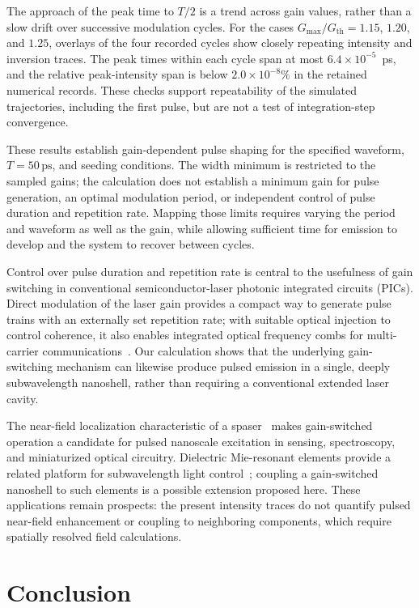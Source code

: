 \documentclass{optica-article}
\begin{document}
The approach of the peak time to $T/2$ is a trend across gain values, rather than a slow drift over successive modulation cycles. For the cases $G_{\max}/G_{\mathrm{th}}=1.15$, $1.20$, and $1.25$, overlays of the four recorded cycles show closely repeating intensity and inversion traces. The peak times within each cycle span at most $6.4\times10^{-5}$~ps, and the relative peak-intensity span is below $2.0\times10^{-8}\%$ in the retained numerical records. These checks support repeatability of the simulated trajectories, including the first pulse, but are not a test of integration-step convergence.

These results establish gain-dependent pulse shaping for the specified waveform, $T=50\,\mathrm{ps}$, and seeding conditions. The width minimum is restricted to the sampled gains; the calculation does not establish a minimum gain for pulse generation, an optimal modulation period, or independent control of pulse duration and repetition rate. Mapping those limits requires varying the period and waveform as well as the gain, while allowing sufficient time for emission to develop and the system to recover between cycles.

Control over pulse duration and repetition rate is central to the usefulness of gain switching in conventional semiconductor-laser photonic integrated circuits (PICs). Direct modulation of the laser gain provides a compact way to generate pulse trains with an externally set repetition rate; with suitable optical injection to control coherence, it also enables integrated optical frequency combs for multi-carrier communications~\cite{Hammad:2021}. Our calculation shows that the underlying gain-switching mechanism can likewise produce pulsed emission in a single, deeply subwavelength nanoshell, rather than requiring a conventional extended laser cavity.

The near-field localization characteristic of a spaser~\cite{stockman:2008} makes gain-switched operation a candidate for pulsed nanoscale excitation in sensing, spectroscopy, and miniaturized optical circuitry. Dielectric Mie-resonant elements provide a related platform for subwavelength light control~\cite{Rybin2024Metaphotonics}; coupling a gain-switched nanoshell to such elements is a possible extension proposed here. These applications remain prospects: the present intensity traces do not quantify pulsed near-field enhancement or coupling to neighboring components, which require spatially resolved field calculations.

\section{Conclusion}
\label{sec:conclusion}
\end{document}
